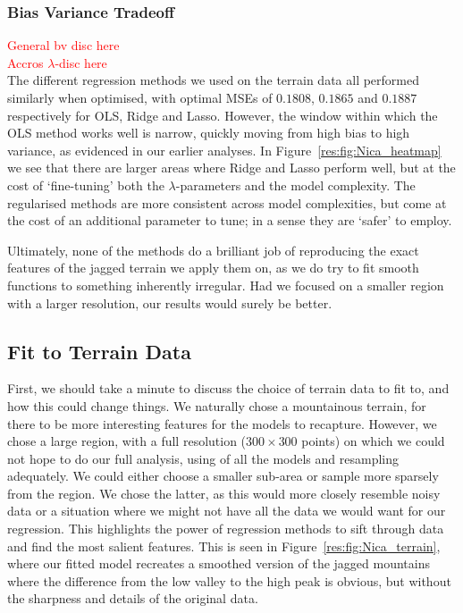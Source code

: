 \documentclass[twocolumn,english,notitlepage]{article}
\newcommand{\comment}[1]{\textcolor{red}{#1}}
\begin{document}
        \subsubsection{Bias Variance Tradeoff}
            \comment{General bv disc here} \\

            \comment{Accros $\lambda$-disc here}\\
            The different regression methods we used on the terrain data all performed similarly when optimised, with optimal MSEs of $0.1808$, $0.1865$ and $0.1887$ respectively for OLS, Ridge and Lasso. However, the window within which the OLS method works well is narrow, quickly moving from high bias to high variance, as evidenced in our earlier analyses. In Figure~\ref{res:fig:Nica_heatmap} we see that there are larger areas where Ridge and Lasso perform well, but at the cost of `fine-tuning' both the $\lambda$-parameters and the model complexity. The regularised methods are more consistent across model complexities, but come at the cost of an additional parameter to tune; in a sense they are `safer' to employ.

            Ultimately, none of the methods do a brilliant job of reproducing the exact features of the jagged terrain we apply them on, as we do try to fit smooth functions to something inherently irregular. Had we focused on a smaller region with a larger resolution, our results would surely be better.

    \subsection{Fit to Terrain Data}
        First, we should take a minute to discuss the choice of terrain data to fit to, and how this could change things. We naturally chose a mountainous terrain, for there to be more interesting features for the models to recapture. However, we chose a large region, with a full resolution ($300\times 300$ points) on which we could not hope to do our full analysis, using of all the models and resampling adequately. We could either choose a smaller sub-area or sample more sparsely from the region. We chose the latter, as this would more closely resemble noisy data or a situation where we might not have all the data we would want for our regression. This highlights the power of regression methods to sift through data and find the most salient features. This is seen in Figure~\ref{res:fig:Nica_terrain}, where our fitted model recreates a smoothed version of the jagged mountains where the difference from the low valley to the high peak is obvious, but without the sharpness and details of the original data.
\end{document}
